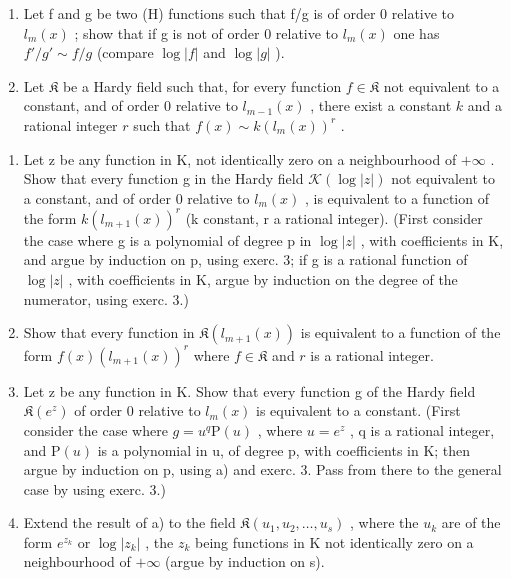 \begin{enumerate}
\def\labelenumi{\arabic{enumi})}
\setcounter{enumi}{2}
\item
  Let f and g be two (H) functions such that f/g is of order 0 relative to \(l_{m}(x)\) ; show that if g is not of order 0 relative to \(l_{m}(x)\) one has \(f'/g' \sim f/g\) (compare \(\log |f|\) and \(\log |g|\) ).
\item
  Let \(\mathfrak{K}\) be a Hardy field such that, for every function \(f\in \mathfrak{K}\) not equivalent to a constant, and of order 0 relative to \(l_{m - 1}(x)\) , there exist a constant \(k\) and a rational integer \(r\) such that \(f(x)\sim k(l_m(x))^r\) .
\end{enumerate}

\begin{enumerate}
\def\labelenumi{\alph{enumi})}
\item
  Let z be any function in K, not identically zero on a neighbourhood of \(+\infty\) . Show that every function g in the Hardy field \(\mathcal{K}(\log|z|)\) not equivalent to a constant, and of order 0 relative to \(l_{m}(x)\) , is equivalent to a function of the form \(k(l_{m+1}(x))^{r}\) (k constant, r a rational integer). (First consider the case where g is a polynomial of degree p in \(\log|z|\) , with coefficients in K, and argue by induction on p, using exerc. 3; if g is a rational function of \(\log|z|\) , with coefficients in K, argue by induction on the degree of the numerator, using exerc. 3.)
\item
  Show that every function in \(\mathfrak{K}(l_{m+1}(x))\) is equivalent to a function of the form \(f(x)(l_{m+1}(x))^r\) where \(f \in \mathfrak{K}\) and \(r\) is a rational integer.
\item
  Let z be any function in K. Show that every function g of the Hardy field \(\mathfrak{K}(e^{z})\) of order 0 relative to \(l_{m}(x)\) is equivalent to a constant. (First consider the case where \(g = u^{q} \mathrm{P}(u)\) , where \(u = e^{z}\) , q is a rational integer, and \(\mathrm{P}(u)\) is a polynomial in u, of degree p, with coefficients in K; then argue by induction on p, using a) and exerc. 3. Pass from there to the general case by using exerc. 3.)
\item
  Extend the result of a) to the field \(\mathfrak{K}(u_{1}, u_{2}, \ldots, u_{s})\) , where the \(u_{k}\) are of the form \(e^{z_{k}}\) or \(\log |z_{k}|\) , the \(z_{k}\) being functions in K not identically zero on a neighbourhood of \(+\infty\) (argue by induction on s).
\end{enumerate}

